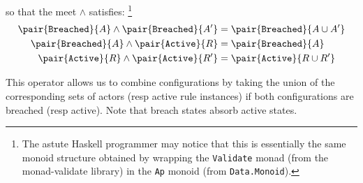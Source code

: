 \documentclass{article}
\begin{document}
so that the meet $\wedge$ satisfies:
\footnote{
  The astute Haskell programmer may notice that this is essentially the same
  monoid structure obtained by wrapping the \texttt{Validate} monad
  (from the monad-validate library)
  in the \texttt{Ap} monoid (from \texttt{Data.Monoid}).
}
\begin{align*}
  \pair{\texttt{Breached}}{A}
  \wedge
  \pair{\texttt{Breached}}{A'}
  & = \pair{\texttt{Breached}}{{A \cup A'}}
  \\
  \pair{\texttt{Breached}}{A}
  \wedge
  \pair{\texttt{Active}}{R}
  & = \pair{\texttt{Breached}}{A}
  \\
  \pair{\texttt{Active}}{R}
  \wedge
  \pair{\texttt{Active}}{R'}
  & = \pair{\texttt{Active}}{R \cup R'}
\end{align*}


This operator allows us to combine configurations by taking the union of the
corresponding sets of actors (resp active rule instances) if both
configurations are breached (resp active).
Note that breach states absorb active states.


\end{document}
